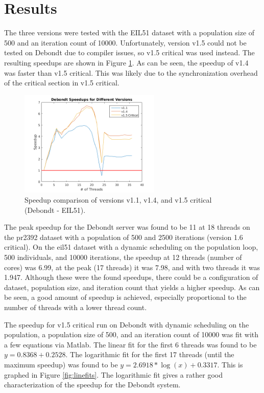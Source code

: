 \documentclass[10pt,letterpaper]{article}
\begin{document}
\newpage
\section{Results} \label{sec:results}
The three versions were tested with the EIL51 dataset with a population size of 500 and an iteration count of 10000. Unfortunately, version v1.5 could not be tested on Debondt due to compiler issues, so v1.5 critical was used instead. The resulting speedups are shown in Figure \ref{fig:versions}. As can be seen, the speedup of v1.4 was faster than v1.5 critical. This was likely due to the synchronization overhead of the critical section in v1.5 critical.

\begin{figure}
\centering
\includegraphics[width=0.6\textwidth]{../img/debondt_versions.png}
\caption{Speedup comparison of versions v1.1, v1.4, and v1.5 critical (Debondt - EIL51).}
\label{fig:versions}
\end{figure}

The peak speedup for the Debondt server was found to be 11 at 18 threads on the pr2392 dataset with a population of 500 and 2500 iterations (version 1.6 critical). On the eil51 dataset with a dynamic scheduling on the population loop, 500 individuals, and 10000 iterations, the speedup at 12 threads (number of cores) was 6.99, at the peak (17 threads) it was 7.98, and with two threads it was 1.947. Although these were the found speedups, there could be a configuration of dataset, population size, and iteration count that yields a higher speedup. As can be seen, a good amount of speedup is achieved, especially proportional to the number of threads with a lower thread count.

The speedup for v1.5 critical run on Debondt with dynamic scheduling on the population, a population size of 500, and an iteration count of 10000 was fit with a few equations via Matlab. The linear fit for the first 6 threads was found to be $ y = 0.8368 + 0.2528 $. The logarithmic fit for the first 17 threads (until the maximum speedup) was found to be $y = 2.6918*\log(x) + 0.3317$. This is graphed in Figure \ref{fig:linefits}. The logarithmic fit gives a rather good characterization of the speedup for the Debondt system.
\end{document}

